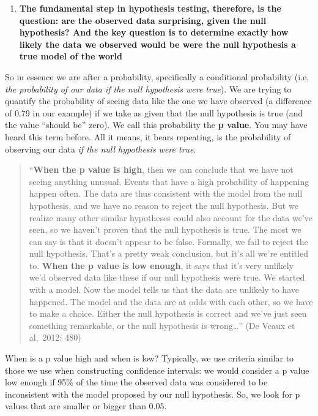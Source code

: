 \documentclass[]{book}
\providecommand{\tightlist}{%
  \setlength{\itemsep}{0pt}\setlength{\parskip}{0pt}}
\theoremstyle{definition}
\theoremstyle{definition}
\theoremstyle{definition}
\theoremstyle{remark}
\begin{document}
\begin{enumerate}
\def\labelenumi{\arabic{enumi}.}
\setcounter{enumi}{3}
\tightlist
\item
  \textbf{The fundamental step in hypothesis testing, therefore, is the
  question: are the observed data surprising, given the null hypothesis?
  And the key question is to determine exactly how likely the data we
  observed would be were the null hypothesis a true model of the world}
\end{enumerate}

So in essence we are after a probability, specifically a conditional
probability (i.e, \emph{the probability of our data if the null
hypothesis were true}). We are trying to quantify the probability of
seeing data like the one we have observed (a difference of 0.79 in our
example) if we take as given that the null hypothesis is true (and the
value ``should be'' zero). We call this probability the \textbf{p
value}. You may have heard this term before. All it means, it bears
repeating, is the probability of observing our data \emph{if the null
hypothesis were true}.

\begin{quote}
``\textbf{When the p value is high}, then we can conclude that we have
not seeing anything unusual. Events that have a high probability of
happening happen often. The data are thus consistent with the model from
the null hypothesis, and we have no reason to reject the null
hypothesis. But we realize many other similar hypotheses could also
account for the data we've seen, so we haven't proven that the null
hypothesis is true. The most we can say is that it doesn't appear to be
false. Formally, we fail to reject the null hypothesis. That's a pretty
weak conclusion, but it's all we're entitled to. \textbf{When the p
value is low enough}, it says that it's very unlikely we'd observed data
like these if our null hypothesis were true. We started with a model.
Now the model tells us that the data are unlikely to have happened. The
model and the data are at odds with each other, so we have to make a
choice. Either the null hypothesis is correct and we've just seen
something remarkable, or the null hypothesis is wrong\ldots{}'' (De
Veaux et al.~2012: 480)
\end{quote}

When is a p value high and when is low? Typically, we use criteria
similar to those we use when constructing confidence intervals: we would
consider a p value low enough if 95\% of the time the observed data was
considered to be inconsistent with the model proposed by our null
hypothesis. So, we look for p values that are smaller or bigger than
0.05.
\end{document}
